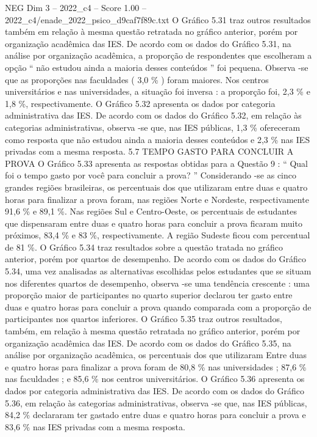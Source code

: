 \begin{textsample}{NEG Dim 3 – 2022\_c4 – Score 1.00 – 2022\_c4/enade\_2022\_psico\_d9caf7f89c.txt}
O Gráfico 5.31 traz outros resultados também em relação à mesma questão retratada no gráfico anterior, porém por organização acadêmica das IES.
De acordo com os dados do Gráfico 5.31, na análise por organização acadêmica, a proporção de respondentes que escolheram a opção “ não estudou ainda a maioria desses conteúdos ” foi pequena.
Observa -se que as proporções nas faculdades ( 3,0 \% ) foram maiores.
Nos centros universitários e nas universidades, a situação foi inversa : a proporção foi, 2,3 \% e 1,8 \%, respectivamente.
O Gráfico 5.32 apresenta os dados por categoria administrativa das IES.
De acordo com os dados do Gráfico 5.32, em relação às categorias administrativas, observa -se que, nas IES públicas, 1,3 \% ofereceram como resposta que não estudou ainda a maioria desses conteúdos e 2,3 \% nas IES privadas com a mesma resposta. 5.7 TEMPO GASTO PARA CONCLUIR A PROVA O Gráfico 5.33 apresenta as respostas obtidas para a Questão 9 : “ Qual foi o tempo gasto por você para concluir a prova? ” Considerando -se as cinco grandes regiões brasileiras, os percentuais dos que utilizaram entre duas e quatro horas para finalizar a prova foram, nas regiões Norte e Nordeste, respectivamente 91,6 \% e 89,1 \%.
Nas regiões Sul e Centro-Oeste, os percentuais de estudantes que dispensaram entre duas e quatro horas para concluir a prova ficaram muito próximos, 83,4 \% e 83 \%, respectivamente.
A região Sudeste ficou com percentual de 81 \%.
O Gráfico 5.34 traz resultados sobre a questão tratada no gráfico anterior, porém por quartos de desempenho.
De acordo com os dados do Gráfico 5.34, uma vez analisadas as alternativas escolhidas pelos estudantes que se situam nos diferentes quartos de desempenho, observa -se uma tendência crescente : uma proporção maior de participantes no quarto superior declarou ter gasto entre duas e quatro horas para concluir a prova quando comparada com a proporção de participantes nos quartos inferiores.
O Gráfico 5.35 traz outros resultados, também, em relação à mesma questão retratada no gráfico anterior, porém por organização acadêmica das IES.
De acordo com os dados do Gráfico 5.35, na análise por organização acadêmica, os percentuais dos que utilizaram Entre duas e quatro horas para finalizar a prova foram de 80,8 \% nas universidades ; 87,6 \% nas faculdades ; e 85,6 \% nos centros universitários.
O Gráfico 5.36 apresenta os dados por categoria administrativa das IES.
De acordo com os dados do Gráfico 5.36, em relação às categorias administrativas, observa -se que, nas IES públicas, 84,2 \% declararam ter gastado entre duas e quatro horas para concluir a prova e 83,6 \% nas IES privadas com a mesma resposta.

\end{textsample}
